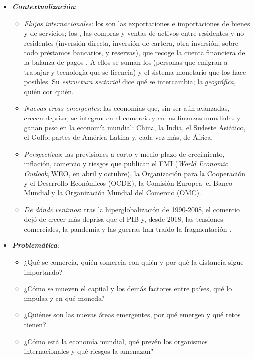 \documentclass[11pt]{article}
\begin{document}
\begin{itemize}
\item \textbf{\emph{Contextualización}}:
  \begin{itemize}
  \item \emph{Flujos internacionales}: los  son las exportaciones e importaciones de bienes y de servicios; los , las compras y ventas de activos entre residentes y no residentes (inversión directa, inversión de cartera, otra inversión, sobre todo préstamos bancarios, y reservas), que recoge la cuenta financiera de la balanza de pagos . A ellos se suman los  (personas que emigran a trabajar y tecnología que se licencia) y el sistema monetario que los hace posibles. Su \emph{estructura sectorial} dice qué se intercambia; la \emph{geográfica}, quién con quién.
  \item \emph{Nuevas áreas emergentes}: las economías que, sin ser aún avanzadas, crecen deprisa, se integran en el comercio y en las finanzas mundiales y ganan peso en la economía mundial: China, la India, el Sudeste Asiático, el Golfo, partes de América Latina y, cada vez más, de África.
  \item \emph{Perspectivas}: las previsiones a corto y medio plazo de crecimiento, inflación, comercio y riesgos que publican el FMI (\emph{World Economic Outlook}, WEO, en abril y octubre), la Organización para la Cooperación y el Desarrollo Económicos (OCDE), la Comisión Europea, el Banco Mundial y la Organización Mundial del Comercio (OMC).
  \item \emph{De dónde venimos}: tras la hiperglobalización de 1990-2008, el comercio dejó de crecer más deprisa que el PIB y, desde 2018, las tensiones comerciales, la pandemia y las guerras han traído la fragmentación\nocite{BM2026WDIComercio32}  .
  \end{itemize}

\item \textbf{\emph{Problemática}}:
  \begin{itemize}
  \item ¿Qué se comercia, quién comercia con quién y por qué la distancia sigue importando?
  \item ¿Cómo se mueven el capital y los demás factores entre países, qué lo impulsa y en qué moneda?
  \item ¿Quiénes son las nuevas áreas emergentes, por qué emergen y qué retos tienen?
  \item ¿Cómo está la economía mundial, qué prevén los organismos internacionales y qué riesgos la amenazan?
  \end{itemize}


\end{itemize}
\end{document}
